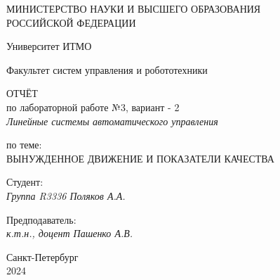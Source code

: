 \thispagestyle{empty}

\begin{center}
    МИНИСТЕРСТВО НАУКИ И ВЫСШЕГО ОБРАЗОВАНИЯ \\ РОССИЙСКОЙ ФЕДЕРАЦИИ

    \vspace{20pt}

    Университет ИТМО

    \vspace{20pt}

    Факультет систем управления и робототехники
\end{center}

\vfill

\begin{center}
    ОТЧЁТ \\  
    по лабораторной работе  №3, вариант - 2 \\
    \textit{Линейные системы автоматического управления}

    \vspace{20pt}

    по теме: \\
    \uppercase{Вынужденное движение и показатели качества}
\end{center}

\vfill

\noindent Студент: \\
\textit{Группа R3336 \hfill Поляков А.А.}


    \vspace{20pt}

    \noindent Предподаватель: \\
    \textit{к.т.н., доцент \hfill  Пашенко А.В.}

\vfill

\begin{center}
    Санкт-Петербург \\ 2024
\end{center}